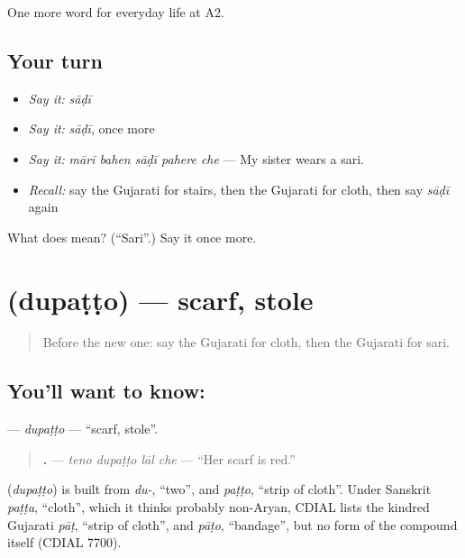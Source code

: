 \begin{grammarlens}[title={What you've built}]
One more word for everyday life at A2.
\end{grammarlens}

\subsection*{Your turn}
\begin{itemize}
\raggedright
  \item \emph{Say it:} \emph{sāḍī}
  \item \emph{Say it:} \emph{sāḍī}, once more
  \item \emph{Say it:} \emph{mārī bahen sāḍī pahere che} — My sister wears a sari.
  \item \emph{Recall:} say the Gujarati for stairs, then the Gujarati for cloth, then say \emph{sāḍī} again
\end{itemize}

\begin{tcolorbox}[breakable,colback=teal!4,colframe=teal!35!black,title={Before you move on}]
What does  mean? (\textquotedblleft{}Sari\textquotedblright{}.) Say it once more.
\end{tcolorbox}
\section[\texorpdfstring{\gu{દુપટ્ટો} (dupaṭṭo)}{દુપટ્ટો (dupaṭṭo)}]{ (dupaṭṭo) — scarf, stole}

\label{lesson:GU-C154-dupatto}



\begin{quote}
Before the new one: say the Gujarati for cloth, then the Gujarati for sari.
\end{quote}

\subsection*{You'll want to know: }
\textbf{} — \emph{dupaṭṭo} — \textquotedblleft{}scarf, stole\textquotedblright{}.

\begin{quote}
\textbf{   .} — \emph{teno dupaṭṭo lāl che} — \textquotedblleft{}Her scarf is red.\textquotedblright{}
\end{quote}

\begin{cousinweb}
\textbf{} (\emph{dupaṭṭo}) is built from \emph{du-}, \textquotedblleft{}two\textquotedblright{}, and \emph{paṭṭo}, \textquotedblleft{}strip of cloth\textquotedblright{}. Under Sanskrit \emph{paṭṭa}, \textquotedblleft{}cloth\textquotedblright{}, which it thinks probably non-Aryan, CDIAL lists the kindred Gujarati \emph{pāṭ}, \textquotedblleft{}strip of cloth\textquotedblright{}, and \emph{pāṭo}, \textquotedblleft{}bandage\textquotedblright{}, but no form of the compound itself (CDIAL 7700).
\end{cousinweb}

